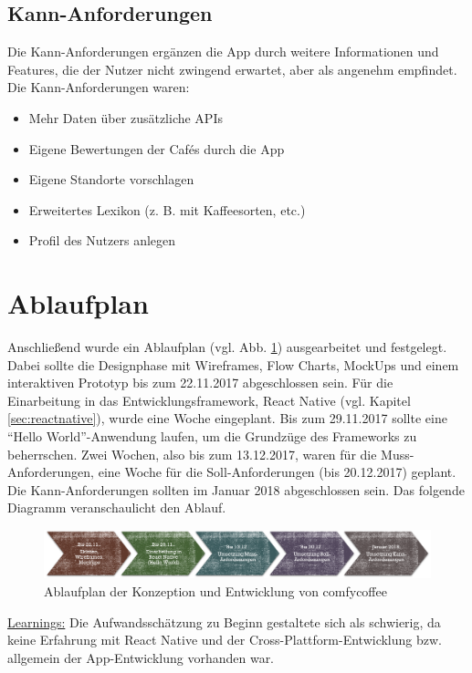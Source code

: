 \subsection{Kann-Anforderungen}
Die Kann-Anforderungen ergänzen die App durch weitere Informationen und Features, die der Nutzer nicht zwingend erwartet, aber als angenehm empfindet. Die Kann-Anforderungen waren:

\begin{itemize}
	\item Mehr Daten über zusätzliche APIs
	\item Eigene Bewertungen der Cafés durch die App
	\item Eigene Standorte vorschlagen
	\item Erweitertes Lexikon (z. B. mit Kaffeesorten, etc.)
	\item Profil des Nutzers anlegen
\end{itemize}


\section{Ablaufplan}
\label{sec:ablaufplan}
Anschließend wurde ein Ablaufplan (vgl. Abb. \ref{fig:ablaufplan}) ausgearbeitet und festgelegt. Dabei sollte die Designphase mit Wireframes, Flow Charts, MockUps und einem interaktiven Prototyp bis zum 22.11.2017 abgeschlossen sein. Für die Einarbeitung in das Entwicklungsframework, React Native (vgl. Kapitel \ref{sec:reactnative}), wurde eine Woche eingeplant. Bis zum 29.11.2017 sollte eine ``Hello World''-Anwendung laufen, um die Grundzüge des Frameworks zu beherrschen. Zwei Wochen, also bis zum 13.12.2017, waren für die Muss-Anforderungen, eine Woche für die Soll-Anforderungen (bis 20.12.2017) geplant. Die Kann-Anforderungen sollten im Januar 2018 abgeschlossen sein. Das folgende Diagramm veranschaulicht den Ablauf.\newline

\begin{figure}[h!]
    \centering
		\includegraphics[width=\textwidth]{Bilder/ablaufplan.png}
		\caption{Ablaufplan der Konzeption und Entwicklung von comfycoffee}
		\label{fig:ablaufplan}
\end{figure}

\underline{Learnings:}
Die Aufwandsschätzung zu Beginn gestaltete sich als schwierig, da keine Erfahrung mit React Native und der Cross-Plattform-Entwicklung bzw. allgemein der App-Entwicklung vorhanden war.

